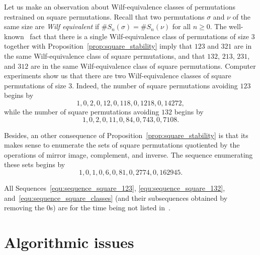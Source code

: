 \documentclass[a4paper]{llncs}
\begin{document}
Let us make an observation about Wilf-equivalence classes of permutations 
restrained on square permutations. Recall that two permutations $\sigma$ 
and $\nu$ of the same size are {\em Wilf equivalent} if 
$\# S_n(\sigma) = \# S_n(\nu)$ for all $n \geq 0$. The
well-known~\cite{Simion:Schmidt:EJC:1985} fact that there is a single
Wilf-equivalence class of permutations of size $3$ together with
Proposition~\ref{prop:square_stability} imply that $123$ and $321$ are
in the same Wilf-equivalence class of square permutations, and that
$132$, $213$, $231$, and $312$ are in the same Wilf-equivalence class of
square permutations. Computer experiments show us that there are two
Wilf-equivalence classes of square permutations of size $3$. Indeed, the
number of square permutations avoiding $123$ begins by
\begin{equation} \label{equ:sequence_square_123}
    1, 0, 2, 0, 12, 0, 118, 0, 1218, 0, 14272,
\end{equation}
while the number of square permutations avoiding $132$ begins by
\begin{equation} \label{equ:sequence_square_132}
    1, 0, 2, 0, 11, 0, 84, 0, 743, 0, 7108.
\end{equation}

Besides, an other consequence of Proposition~\ref{prop:square_stability}
is that its makes sense to enumerate the sets of square permutations
quotiented by the operations of mirror image, complement, and
inverse. The sequence enumerating these sets begins by
\begin{equation} \label{equ:sequence_square_classes}
    1, 0, 1, 0, 6, 0, 81, 0, 2774, 0, 162945.
\end{equation}

All Sequences~\eqref{equ:sequence_square_123}, \eqref{equ:sequence_square_132},
and~\eqref{equ:sequence_square_classes} (and their subsequences obtained
by removing the $0$s) are for the time being not listed in~\cite{Slo}.


\section{Algorithmic issues}
\label{section:Algorithmic issues}
\end{document}
